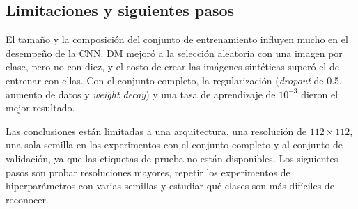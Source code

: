 \subsection{Limitaciones y siguientes pasos}
El tamaño y la composición del conjunto de entrenamiento influyen mucho en el desempeño de la CNN. DM mejoró a la selección aleatoria con una imagen por clase, pero no con diez, y el costo de crear las imágenes sintéticas superó el de entrenar con ellas. Con el conjunto completo, la regularización (\textit{dropout} de 0.5, aumento de datos y \textit{weight decay}) y una tasa de aprendizaje de $10^{-3}$ dieron el mejor resultado.

Las conclusiones están limitadas a una arquitectura, una resolución de $112\times112$, una sola semilla en los experimentos con el conjunto completo y al conjunto de validación, ya que las etiquetas de prueba no están disponibles. Los siguientes pasos son probar resoluciones mayores, repetir los experimentos de hiperparámetros con varias semillas y estudiar qué clases son más difíciles de reconocer.
